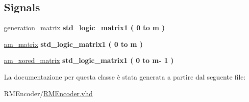 \subsection*{Signals}
 \begin{DoxyCompactItemize}
\item 
\hypertarget{class_r_m_encoder_1_1_structural_gadab82093cb9537c2274c9fbdac7d7541}{\hyperlink{group___r_m_encoder_gadab82093cb9537c2274c9fbdac7d7541}{generation\+\_\+matrix} {\bfseries \textcolor{vhdlchar}{std\+\_\+logic\+\_\+matrix1}\textcolor{vhdlchar}{ }\textcolor{vhdlchar}{(}\textcolor{vhdlchar}{ }\textcolor{vhdlchar}{ } \textcolor{vhdldigit}{0} \textcolor{vhdlchar}{ }\textcolor{keywordflow}{to}\textcolor{vhdlchar}{ }\textcolor{vhdlchar}{ }\textcolor{vhdlchar}{ }\textcolor{vhdlchar}{ }\textcolor{vhdlchar}{m}\textcolor{vhdlchar}{ }\textcolor{vhdlchar}{)}\textcolor{vhdlchar}{ }} }\label{class_r_m_encoder_1_1_structural_gadab82093cb9537c2274c9fbdac7d7541}

\item 
\hypertarget{class_r_m_encoder_1_1_structural_ga18dae7d7f66de65d186770981462b778}{\hyperlink{group___r_m_encoder_ga18dae7d7f66de65d186770981462b778}{am\+\_\+matrix} {\bfseries \textcolor{vhdlchar}{std\+\_\+logic\+\_\+matrix1}\textcolor{vhdlchar}{ }\textcolor{vhdlchar}{(}\textcolor{vhdlchar}{ }\textcolor{vhdlchar}{ } \textcolor{vhdldigit}{0} \textcolor{vhdlchar}{ }\textcolor{keywordflow}{to}\textcolor{vhdlchar}{ }\textcolor{vhdlchar}{ }\textcolor{vhdlchar}{ }\textcolor{vhdlchar}{ }\textcolor{vhdlchar}{m}\textcolor{vhdlchar}{ }\textcolor{vhdlchar}{)}\textcolor{vhdlchar}{ }} }\label{class_r_m_encoder_1_1_structural_ga18dae7d7f66de65d186770981462b778}

\item 
\hypertarget{class_r_m_encoder_1_1_structural_ga1e49ab26acf7504c0cb20dd0b41e48bb}{\hyperlink{group___r_m_encoder_ga1e49ab26acf7504c0cb20dd0b41e48bb}{am\+\_\+xored\+\_\+matrix} {\bfseries \textcolor{vhdlchar}{std\+\_\+logic\+\_\+matrix1}\textcolor{vhdlchar}{ }\textcolor{vhdlchar}{(}\textcolor{vhdlchar}{ }\textcolor{vhdlchar}{ } \textcolor{vhdldigit}{0} \textcolor{vhdlchar}{ }\textcolor{keywordflow}{to}\textcolor{vhdlchar}{ }\textcolor{vhdlchar}{ }\textcolor{vhdlchar}{ }\textcolor{vhdlchar}{ }\textcolor{vhdlchar}{m}\textcolor{vhdlchar}{-\/}\textcolor{vhdlchar}{ } \textcolor{vhdldigit}{1} \textcolor{vhdlchar}{ }\textcolor{vhdlchar}{)}\textcolor{vhdlchar}{ }} }\label{class_r_m_encoder_1_1_structural_ga1e49ab26acf7504c0cb20dd0b41e48bb}

\end{DoxyCompactItemize}


La documentazione per questa classe è stata generata a partire dal seguente file\+:\begin{DoxyCompactItemize}
\item 
R\+M\+Encoder/\hyperlink{_r_m_encoder_8vhd}{R\+M\+Encoder.\+vhd}\end{DoxyCompactItemize}
